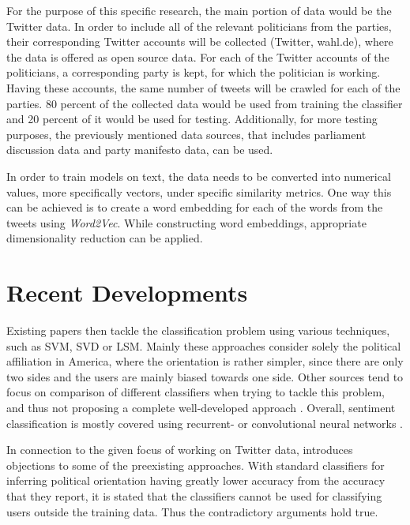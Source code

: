 \documentclass[final]{beamer}
\begin{document}
\begin{frame}[t]
\begin{multicols}{3}
For the purpose of this specific research, the main portion of data would be the Twitter data. In order to include all of the relevant politicians from the parties, their corresponding Twitter accounts will be collected (Twitter, wahl.de), where the data is offered as open source data.
For each of the Twitter accounts of the politicians, a corresponding party is kept, for which the politician is working. Having these accounts, the same number of tweets will be crawled for each of the parties. 80 percent of the collected data would be used from training the classifier and 20 percent of it would be used for testing.
Additionally, for more testing purposes, the previously mentioned data sources, that includes parliament discussion data and party manifesto data, can be used. 

In order to train models on text, the data needs to be converted into numerical values, more specifically vectors, under specific similarity metrics. One way this can be achieved is to create a word embedding for each of the words from the tweets using \textit{Word2Vec}. While constructing word embeddings, appropriate dimensionality reduction can be applied.




\section{Recent Developments}


Existing papers \cite{Misra20XX} then tackle the classification problem using various techniques, such as SVM, SVD or LSM. Mainly these approaches consider solely the political affiliation in America, where the orientation is rather simpler, since there are only two sides and the users are mainly biased towards one side. 
Other sources tend to focus on comparison of different classifiers when trying to tackle this problem, and thus not proposing a complete well-developed approach \cite{Bhanda2009}.
Overall, sentiment classification is mostly covered using recurrent- or convolutional neural networks \cite{Kim2014}.

In connection to the given focus of working on Twitter data, \cite{Cohen20XX} introduces objections to some of the preexisting approaches. With standard classifiers for inferring political orientation having greatly lower accuracy from the accuracy that they report, it is stated that the classifiers cannot be used for classifying users outside the training data. Thus the contradictory arguments hold true.


\end{multicols}
\end{frame}
\end{document}
